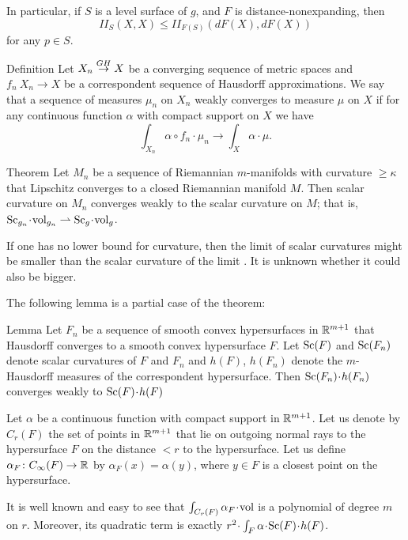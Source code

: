 \documentclass{article}
\begin{document}
In particular, if $S$ is a level surface of $g$, and $F$ is distance-nonexpanding, then 
$$I\!I_S(X,X)\le I\!I_{F(S)}(dF(X),dF(X))$$
for any $p\in S$.

\begin{thm}{Definition}
Let $X_n \buildrel {GH} \over \rightarrow X$ be a converging sequence of metric spaces and $f_n\:X_n\to X$ be a correspondent sequence of Hausdorff approximations.
We say that a sequence of measures $\mu_n$ on $X_n$ weakly converges to
measure $\mu$ on $X$ if for any continuous function $\alpha$ with compact
support on $X$ we have
\[\int_{X_n} \alpha\circ f_n\cdot \mu_n\to \int_{X} \alpha \cdot\mu.\]
\end{thm}


\begin{thm}{Theorem}\label{B.3.} Let $M_n$ be a sequence of Riemannian $m$-manifolds with curvature
$\ge \kappa$ that Lipschitz converges to a closed Riemannian manifold $M$.
Then scalar curvature on $M_n$ converges weakly to the scalar curvature on $M$;
that is, $\Sc_{g_n}\cdot \vol_{g_n}\rightharpoonup\Sc_{g}\cdot \vol_{g}$.
\end{thm}


If one has no lower bound for curvature, then the limit of scalar curvatures might be smaller than the scalar curvature of the limit \cite{Loh-SCH}.
It is unknown whether it could also be bigger.

The following lemma is a partial case of the theorem:

\begin{thm}{Lemma}
Let $F_n$ be a sequence of smooth convex hypersurfaces in $\mathbb{R}^{m+1}$ that Hausdorff converges to a smooth convex hypersurface $F$.
Let $\mathrm{Sc}(F)$ and $\mathrm{Sc}(F_n)$ denote scalar curvatures of $F$ and $F_n$
and $h(F)$, $h(F_n)$ denote the $m$-Hausdorff measures of the
correspondent hypersurface.
Then $\Sc(F_n)\cdot h(F_n)$ converges weakly to $\Sc(F)\cdot h(F)$
\end{thm}


Let $\alpha$ be a continuous function with compact support in $\mathbb{R}^{m+1}$.
Let us denote by $C_r(F)$ the set of points in $\mathbb{R}^{m+1}$ that lie on outgoing normal rays to the hypersurface $F$ on the distance $< r$ to the hypersurface.
Let us define $\alpha_F\colon C_\infty(F)\to \mathbb{R}$ by $\alpha_F(x)=\alpha(y)$, where $y\in F$ is a closest point on the hypersurface.

It is well known and easy to see that
$\int_{C_r(F)}\alpha_F\cdot \vol$ is a polynomial of degree $m$ on $r$.
Moreover, its quadratic term is exactly $r^2\cdot\int_F\alpha\cdot \Sc(F)
\cdot h(F)$.
\end{document}

